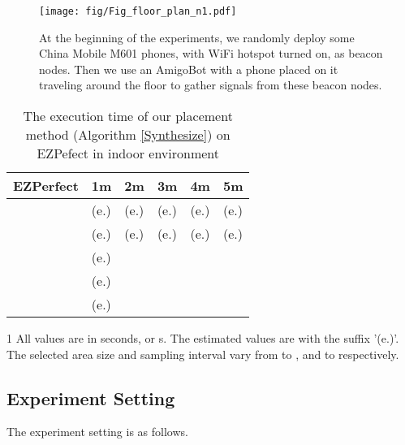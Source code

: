 \documentclass[10pt, conference, letterpaper]{IEEEtran}
\begin{document}
\begin{figure*}
\centering
\texttt{[image: fig/Fig\_floor\_plan\_n1.pdf]}\\
\caption{\textrm{At the beginning of the experiments, we randomly deploy some China Mobile M601 phones, with WiFi hotspot turned on, as beacon nodes. Then we use an AmigoBot with a phone placed on it traveling around the floor to gather signals from these beacon nodes.}} \label{fig6}
\end{figure*}

\begin{table}[!t]
\renewcommand{\arraystretch}{1.0}
\caption{The execution time of our placement method (Algorithm \ref{Synthesize}) on EZPefect in indoor environment} \label{experiment_time_EZPefect}
\centering
\begin{threeparttable}
\begin{tabular}{|c|p{0.9cm}|p{0.9cm}|p{0.9cm}|p{0.9cm}|p{0.9cm}|}
  \hline
EZPerfect  & 1m & 2m & 3m & 4m & 5m \\
  \hline
   & (e.) & (e.) & (e.) & (e.) & (e.)  \\
  \hline
   & (e.) & (e.) & (e.) & (e.) & (e.) \\
  \hline
   & (e.) &  &  &  &  \\
  \hline
   & (e.) &  &  &  &  \\
  \hline
   & (e.) &  &  &  &  \\
  \hline
\end{tabular}
\begin{tablenotes}
    \footnotesize
    \item[1] All values are in seconds, or s. The estimated values are with the suffix '(e.)'. The selected area size and sampling interval vary from  to , and  to  respectively.
\end{tablenotes}
\end{threeparttable}
\end{table}

\subsection{Experiment Setting}
The experiment setting is as follows.
\end{document}
